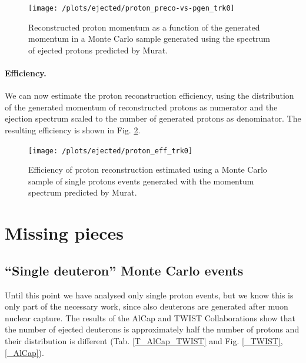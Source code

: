 \documentclass[12pt,a4paper,openright, oneside, titlepage]{book} %
\begin{document}
\begin{figure}[!htb]
\centering
\texttt{[image: /plots/ejected/proton\_preco-vs-pgen\_trk0]}
\caption[Reconstructed vs generated momentum (ejected protons)]
{Reconstructed proton momentum as a function of the generated momentum 
in a Monte Carlo sample generated
using the spectrum of ejected protons predicted by Murat.}
\label{_proton_preco-vs-pgen_trk0}
\end{figure}

\paragraph{Efficiency.} We can now estimate the proton reconstruction efficiency, 
using the distribution of the generated momentum of reconstructed protons as numerator 
and the ejection spectrum scaled to the number of generated protons as denominator. 
The resulting efficiency is shown in Fig. \ref{_proton_eff_trk0}.

\begin{figure}[!htb]
\centering
\texttt{[image: /plots/ejected/proton\_eff\_trk0]}
\caption[Efficiency of proton reconstruction]
{Efficiency of proton reconstruction estimated using a Monte Carlo sample of single protons events 
generated with the momentum spectrum predicted by Murat.}
\label{_proton_eff_trk0}
\end{figure}

\section{Missing pieces}
\subsection{``Single deuteron'' Monte Carlo events}
Until this point we have analysed only single proton events, 
but we know this is only part of the necessary work, 
since also deuterons are generated after muon nuclear capture.
The results of the AlCap and TWIST Collaborations
show that the number of ejected deuterons is approximately 
half the number of protons and their distribution is different
(Tab. \ref{T_AlCap_TWIST} and Fig.  \ref{_TWIST},  \ref{_AlCap}).
\end{document}
